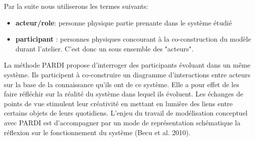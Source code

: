 Par la suite nous utiliserons les termes suivants:
\begin{itemize}
\item \textbf{acteur/role}: personne physique partie prenante dans le système étudié
\item \textbf{participant} : personnes physiques concourant à la co-construction du modèle durant l'atelier. C'est donc un sous ensemble des "acteurs".
\end{itemize}

\vspace{0.5cm}

La méthode PARDI propose d'interroger des participants évoluant dans un même système. Ils participent à co-construire un diagramme d'interactions entre acteurs sur la base de la connaissance qu'ils ont de ce système. Elle a pour effet de les faire réfléchir sur la réalité du système dans lequel ils évoluent. Les échanges de points de vue stimulent leur créativité en mettant en lumière des liens entre certains objets de leurs quotidiens. L'enjeu du travail de modélisation conceptuel avec PARDI est d'accompagner par un mode de représentation schématique la réflexion sur le fonctionnement du système (Becu et al. 2010).\\


